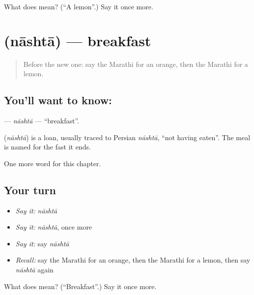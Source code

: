 \begin{tcolorbox}[breakable,colback=teal!4,colframe=teal!35!black,title={Before you move on}]
What does  mean? (\textquotedblleft{}A lemon\textquotedblright{}.) Say it once more.
\end{tcolorbox}
\section[\texorpdfstring{\mr{नाश्ता} (nāshtā)}{नाश्ता (nāshtā)}]{ (nāshtā) — breakfast}

\label{lesson:MR-C88-nashta}



\begin{quote}
Before the new one: say the Marathi for an orange, then the Marathi for a lemon.
\end{quote}

\subsection*{You'll want to know: }
\textbf{} — \emph{nāshtā} — \textquotedblleft{}breakfast\textquotedblright{}.

\begin{cousinweb}
\textbf{} (\emph{nāshtā}) is a loan, usually traced to Persian \emph{nāshtā}, \textquotedblleft{}not having eaten\textquotedblright{}. The meal is named for the fast it ends.
\end{cousinweb}

\begin{grammarlens}[title={What you've built}]
One more word for this chapter.
\end{grammarlens}

\subsection*{Your turn}
\begin{itemize}
\raggedright
  \item \emph{Say it:} \emph{nāshtā}
  \item \emph{Say it:} \emph{nāshtā}, once more
  \item \emph{Say it:} say \emph{nāshtā}
  \item \emph{Recall:} say the Marathi for an orange, then the Marathi for a lemon, then say \emph{nāshtā} again
\end{itemize}

\begin{tcolorbox}[breakable,colback=teal!4,colframe=teal!35!black,title={Before you move on}]
What does  mean? (\textquotedblleft{}Breakfast\textquotedblright{}.) Say it once more.
\end{tcolorbox}
